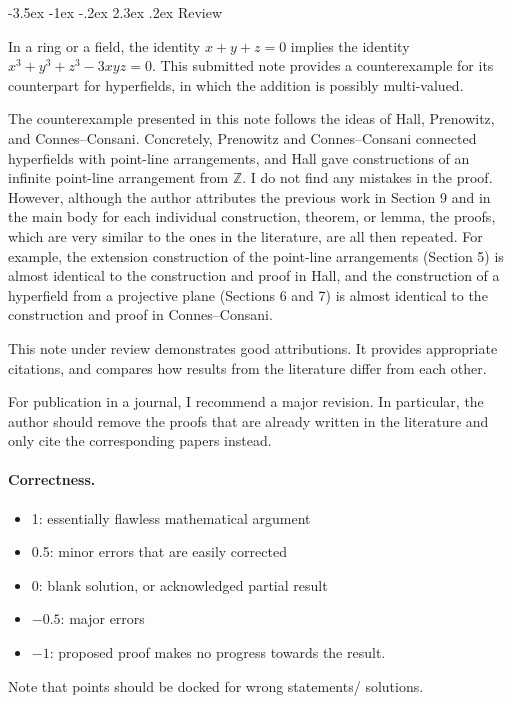 \documentclass[11pt]{article}
\makeatletter
\renewcommand\section{\@startsection{section}{1}{\z@}
  {-3.5ex \@plus -1ex \@minus -.2ex}
  {2.3ex \@plus.2ex}
  {\normalfont\bfseries}}
\theoremstyle{plain}
\theoremstyle{definition}
\makeatother
\begin{document}
\maketitle

\section{Review}

In a ring or a field, the identity $x+y+z = 0$ implies the identity $x^3 + y^3 + z^3 - 3xyz = 0$. This submitted note provides a counterexample for its counterpart for hyperfields, in which the addition is possibly multi-valued. 

The counterexample presented in this note follows the ideas of Hall, Prenowitz, and Connes--Consani. Concretely, Prenowitz and Connes--Consani connected hyperfields with point-line arrangements, and Hall gave constructions of an infinite point-line arrangement from $\mathbb{Z}$. I do not find any mistakes in the proof. However, although the author attributes the previous work in Section 9 and in the main body for each individual construction, theorem, or lemma, the proofs, which are very similar to the ones in the literature, are all then repeated. For example, the extension construction of the point-line arrangements (Section 5) is almost identical to the construction and proof in Hall, and the construction of a hyperfield from a projective plane (Sections 6 and 7) is almost identical to the construction and proof in Connes--Consani. 

This note under review demonstrates good attributions. It provides appropriate citations, and compares how results from the literature differ from each other. 

For publication in a journal, I recommend a major revision. In particular, the author should remove the proofs that are already written in the literature and only cite the corresponding papers instead. 


\paragraph{Correctness.}
\begin{itemize}
	\item  1: essentially flawless mathematical argument
	\item  0.5: minor errors that are easily corrected
	\item  0: blank solution, or acknowledged partial result
	\item  $-0.5$: major errors
	\item  $-1$: proposed proof makes no progress towards the result.
\end{itemize}
Note that points should be docked for wrong statements/ solutions.
\end{document}

